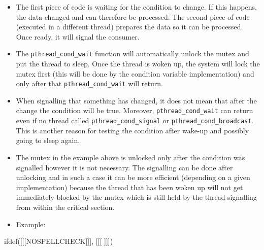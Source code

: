 \begin{itemize}
\prgchars
\item The first piece of code is waiting for the condition to change.  If this
happens, the data changed and can therefore be processed.  The second piece of
code (executed in a different thread) prepares the data so it can be processed.
Once ready, it will signal the consumer.  \item The \texttt{pthread\_cond\_wait}
function will automatically unlock the mutex and put the thread to sleep. Once
the thread is woken up, the system will lock the mutex first (this will be done
by the condition variable implementation) and only after that
\texttt{pthread\_cond\_wait} will return.
\item When signalling that something has changed, it does not mean that after
the change the condition will be true. Moreover,
\texttt{pthread\_cond\_wait} can return even if no thread called
\texttt{pthread\_cond\_signal} or \texttt{pthread\_cond\_broadcast}.
This is another reason for testing the condition after wake-up and possibly
going to sleep again.
\item The mutex in the example above is unlocked only after the condition
was signalled however it is not necessary. The signalling can be done
after unlocking and in such a case it can be more efficient (depending on
a given implementation) because the thread that has been woken up will not get
immediately blocked by the mutex which is still held by the thread signalling
from within the critical section.
\item \label{QUEUESIMULATION} Example:
\end{itemize}



ifdef([[[NOSPELLCHECK]]], [[[
]]])

